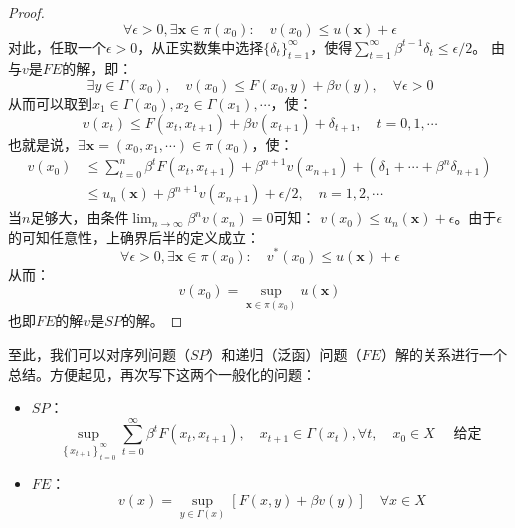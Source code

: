 \begin{proof}
    \begin{equation*}
        \forall \epsilon > 0, \exists \boldsymbol{x}\in\pi\left(x_0\right): \quad v\left(x_0\right)\leq u\left(\boldsymbol{x}\right)+\epsilon  
    \end{equation*}
    对此，任取一个$\epsilon>0$，从正实数集中选择$\{\delta_t\}_{t=1}^{\infty}$，使得$\sum_{t=1}^{\infty}\beta^{t-1}\delta_t\leq \epsilon /2$。
    由与$v$是$FE$的解，即：
    \begin{equation*}
        \exists y\in \Gamma\left(x_0\right),\quad v\left(x_0\right)\leq F\left(x_0,y\right) + \beta v\left(y\right), \quad \forall \epsilon > 0
    \end{equation*}
    从而可以取到$x_1\in\Gamma\left(x_0\right), x_2\in\Gamma\left(x_1\right),\cdots$，使：
    \begin{equation*}
        v\left(x_t\right)\leq F\left(x_t,x_{t+1}\right)+\beta v\left(x_{t+1}\right)+\delta_{t+1},\quad t=0,1,\cdots
    \end{equation*}
    也就是说，$\exists\boldsymbol{x}=\left(x_0,x_1,\cdots\right)\in \pi\left(x_0\right)$，使：
    \begin{equation*}
        \begin{aligned}
            v\left(x_0\right) &\leq \sum_{t=0}^{n}\beta^t F\left(x_t,x_{t+1}\right) + 
                \beta^{n+1}v\left(x_{n+1}\right) + \left(\delta_1+\cdots+\beta^n \delta_{n+1}\right)   \\
                &\leq u_n\left(\boldsymbol{x}\right)+\beta^{n+1}v\left(x_{n+1}\right)+\epsilon/2, \quad n=1,2,\cdots
        \end{aligned}
    \end{equation*}
    当$n$足够大，由条件$\lim_{n\rightarrow \infty}\beta^n v\left(x_n\right)=0$可知：
       $v\left(x_0\right)\leq u_n\left(\boldsymbol{x}\right)+\epsilon$。由于$\epsilon$的可知任意性，上确界后半的定义成立：
    \begin{equation*}
        \forall \epsilon > 0, \exists \boldsymbol{x}\in\pi\left(x_0\right): \quad v^*\left(x_0\right)\leq u\left(\boldsymbol{x}\right)+\epsilon
    \end{equation*}
    从而：
    \begin{equation*}
        v\left(x_0\right)=\sup _{\boldsymbol{x}\in\pi\left(x_0\right)} u\left(\boldsymbol{x}\right)
    \end{equation*}
    也即$FE$的解$v$是$SP$的解。
\end{proof}

至此，我们可以对序列问题（$SP$）和递归（泛函）问题（$FE$）解的关系进行一个总结。方便起见，再次写下这两个一般化的问题：
\begin{itemize}
    \item $SP$：
    $$\sup _{\left\{x_{t+1}\right\}_{t=0}^{\infty}} \sum_{t=0}^{\infty} \beta^t F\left(x_t, x_{t+1}\right),
    \quad x_{t+1}  \in \Gamma\left(x_t\right), \forall t, \quad x_0 \in X \quad \text { 给定 }
    $$
    \item $FE$：
    $$
    v(x)=\sup _{y \in \Gamma(x)}[F(x, y)+\beta v(y)] \quad \forall x \in X
    $$
\end{itemize}

